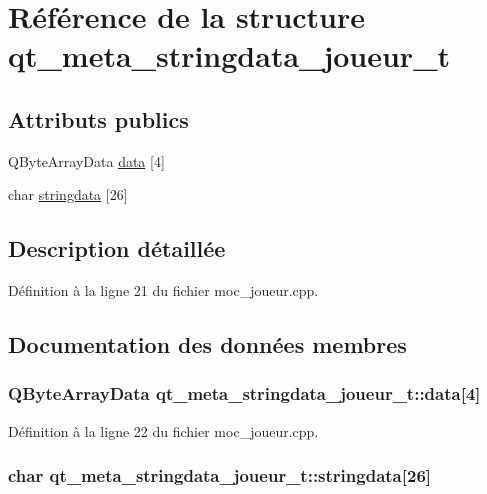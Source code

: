 \hypertarget{structqt__meta__stringdata__joueur__t}{\section{Référence de la structure qt\-\_\-meta\-\_\-stringdata\-\_\-joueur\-\_\-t}
\label{structqt__meta__stringdata__joueur__t}
}
\subsection*{Attributs publics}
\begin{DoxyCompactItemize}
\item 
Q\-Byte\-Array\-Data \hyperlink{structqt__meta__stringdata__joueur__t_ac79c7c132cecd0b1896eda5115c32a8b}{data} \mbox{[}4\mbox{]}
\item 
char \hyperlink{structqt__meta__stringdata__joueur__t_a0e42566504ed17d008808af9dc2a2dcc}{stringdata} \mbox{[}26\mbox{]}
\end{DoxyCompactItemize}


\subsection{Description détaillée}


Définition à la ligne 21 du fichier moc\-\_\-joueur.\-cpp.



\subsection{Documentation des données membres}
\hypertarget{structqt__meta__stringdata__joueur__t_ac79c7c132cecd0b1896eda5115c32a8b}{
\subsubsection[{data}]{\setlength{\rightskip}{0pt plus 5cm}Q\-Byte\-Array\-Data qt\-\_\-meta\-\_\-stringdata\-\_\-joueur\-\_\-t\-::data\mbox{[}4\mbox{]}}}\label{structqt__meta__stringdata__joueur__t_ac79c7c132cecd0b1896eda5115c32a8b}


Définition à la ligne 22 du fichier moc\-\_\-joueur.\-cpp.

\hypertarget{structqt__meta__stringdata__joueur__t_a0e42566504ed17d008808af9dc2a2dcc}{
\subsubsection[{stringdata}]{\setlength{\rightskip}{0pt plus 5cm}char qt\-\_\-meta\-\_\-stringdata\-\_\-joueur\-\_\-t\-::stringdata\mbox{[}26\mbox{]}}}\label{structqt__meta__stringdata__joueur__t_a0e42566504ed17d008808af9dc2a2dcc}


